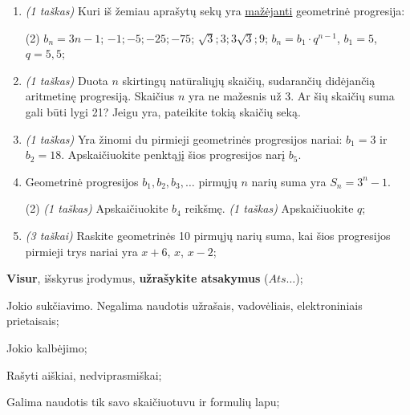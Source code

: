 \documentclass[a4paper]{article}
\begin{document}
\begin{enumerate}
      \item \textit{(1 taškas)} Kuri iš žemiau aprašytų sekų yra
            \underline{mažėjanti} geometrinė progresija:
            \begin{tasks}[item-format={\normalfont}, after-item-skip=2mm,
                        label=\Alph*, label-format={\bfseries}](2)
                  \task $b_n = 3n-1$;
                  \task $-1; -5; -25; -75$;
                  \task $\sqrt{3}; 3; 3\sqrt{3}; 9$;
                  \task $b_n=b_1\cdot q^{n-1}$, $b_1 = 5$, $q = 5,5$;
            \end{tasks}
      \item \textit{(1 taškas)}  Duota $n$ skirtingų natūraliųjų skaičių,
            sudarančių didėjančią
            aritmetinę progresiją. Skaičius $n$ yra ne mažesnis už 3. Ar šių
            skaičių suma
            gali būti lygi 21? Jeigu yra, pateikite tokią skaičių seką.
      \item \textit{(1 taškas)}  Yra žinomi du pirmieji geometrinės progresijos
            nariai: $b_1 = 3$ ir $b_2 = 18$. Apskaičiuokite penktąjį šios
            progresijos narį
            $b_5$.
      \item Geometrinė progresijos $b_1, b_2, b_3, \ldots$ pirmųjų $n$ narių
            suma yra $S_{n} = 3^{n}-1$.
            \begin{tasks}[item-format={\normalfont}, after-item-skip=2mm](2)
                  \task \textit{(1 taškas)} Apskaičiuokite $b_4$ reikšmę.
                  \task \textit{(1 taškas)} Apskaičiuokite $q$;
            \end{tasks}
      \item \textit{(3 taškai)} Raskite geometrinės 10 pirmųjų narių
            suma, kai šios progresijos pirmieji trys nariai yra $x+6$, $x$,
            $x-2$;
\end{enumerate}

\begin{small}
      \begin{enumerate*}[label={(\arabic*)}]
            \item \textbf{Visur}, išskyrus įrodymus, \textbf{užrašykite
                  atsakymus} ($Ats\ldots$);
            \item Jokio sukčiavimo. Negalima naudotis užrašais, vadovėliais,
            elektroniniais prietaisais;
            \item Jokio kalbėjimo;
            \item Rašyti aiškiai, nedviprasmiškai;
            \item Galima naudotis tik savo skaičiuotuvu ir formulių lapu;
      \end{enumerate*}
\end{small}
\end{document}
